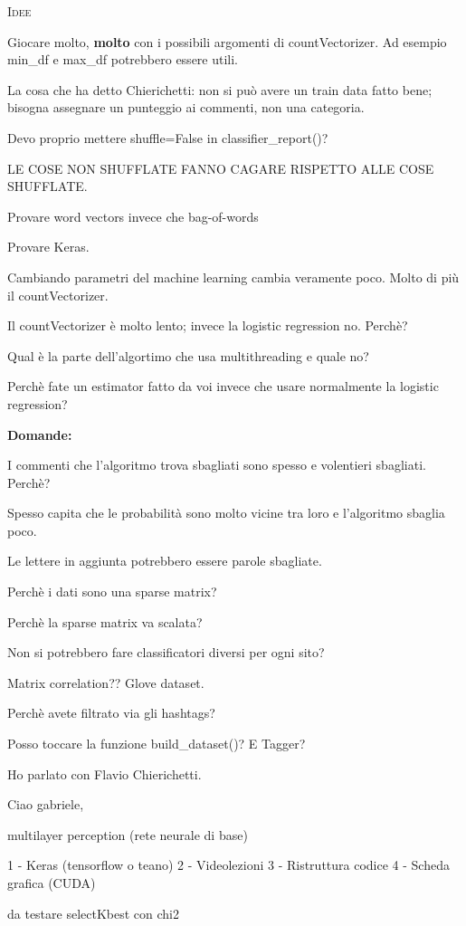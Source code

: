 \documentclass[a4paper,10pt]{article} %
\newcommand{\msection}[1]{%
    {\newpage\bigbreak \bigbreak \par \hfil \huge \textsc {#1}}\par}
\renewcommand{\b}[1]{%
    {\textbf{#1}}}
\begin{document}
\msection{Idee }

Giocare molto, \b{molto} con i possibili argomenti di countVectorizer. Ad esempio min\_df e max\_df potrebbero essere utili.

La cosa che ha detto Chierichetti: non si può avere un train data fatto bene; bisogna assegnare un punteggio ai commenti, non una categoria.

Devo proprio mettere shuffle=False in classifier\_report()?

LE COSE NON SHUFFLATE FANNO CAGARE RISPETTO ALLE COSE SHUFFLATE.

Provare word vectors invece che bag-of-words

Provare Keras.

\bigbreak

Cambiando parametri del machine learning cambia veramente poco. Molto di più il countVectorizer.

Il countVectorizer è molto lento; invece la logistic regression no. Perchè?

Qual è la parte dell'algortimo che usa multithreading e quale no?

Perchè fate un estimator fatto da voi invece che usare normalmente la logistic regression?

\b{Domande:}


I commenti che l'algoritmo trova sbagliati sono spesso e volentieri sbagliati. Perchè?

Spesso capita che le probabilità sono molto vicine tra loro e l'algoritmo sbaglia poco.

Le lettere in aggiunta potrebbero essere parole sbagliate.

Perchè i dati sono una sparse matrix?

Perchè la sparse matrix va scalata?

Non si potrebbero fare classificatori diversi per ogni sito?

Matrix correlation?? Glove dataset. 

Perchè avete filtrato via gli hashtags?

Posso toccare la funzione build\_dataset()? E Tagger?

Ho parlato con Flavio Chierichetti.

Ciao gabriele, 



multilayer perception (rete neurale di base)

1 - Keras (tensorflow o teano)
2 - Videolezioni
3 - Ristruttura codice
4 - Scheda grafica (CUDA)


da testare selectKbest con chi2
\end{document}
